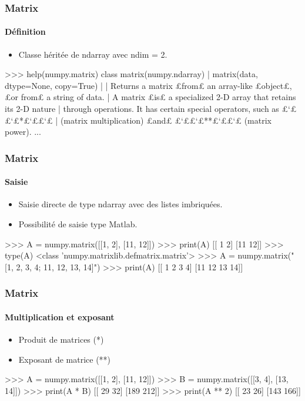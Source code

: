 \begin{frame}[fragile]
\frametitle{Matrix}
\framesubtitle{Définition}
\begin{itemize}
 \item Classe héritée de ndarray avec ndim = 2.  
\end{itemize}
\begin{pythonConsole}
>>> help(numpy.matrix)
class matrix(numpy.ndarray)         
 |  matrix(data, dtype=None, copy=True)
 |  
 |  Returns a matrix £from£ an array-like £object£, £or from£ a string of data.
 |  A matrix £is£ a specialized 2-D array that retains its 2-D nature
 |  through operations.  It has certain special operators, such as £`££`£*£`££`£
 |  (matrix multiplication) £and£ £`££`£**£`££`£ (matrix power).
...
\end{pythonConsole}
\end{frame}
\begin{frame}[fragile]
\frametitle{Matrix}
\framesubtitle{Saisie}
\begin{itemize}
 \item Saisie directe de type ndarray avec des listes imbriquées. 
 \item Possibilité de saisie type Matlab.
\end{itemize}
\begin{pythonConsole}
>>> A = numpy.matrix([[1, 2], [11, 12]])
>>> print(A)
[[ 1  2]
 [11 12]]
>>> type(A)
 <class 'numpy.matrixlib.defmatrix.matrix'>
>>> A = numpy.matrix("[1, 2, 3, 4; 11, 12, 13, 14]")
>>> print(A)
[[ 1  2  3  4]
 [11 12 13 14]]
\end{pythonConsole}
\end{frame}
\begin{frame}[fragile]
\frametitle{Matrix}
\framesubtitle{Multiplication et exposant}
\begin{itemize}
 \item Produit de matrices (*)
 \item Exposant de matrice (**)
\end{itemize}
\begin{pythonConsole}
>>> A = numpy.matrix([[1, 2], [11, 12]])
>>> B = numpy.matrix([[3, 4], [13, 14]])
>>> print(A * B)
[[ 29  32]
 [189 212]]
>>> print(A ** 2)
[[ 23  26]
 [143 166]]
\end{pythonConsole}
\end{frame}
